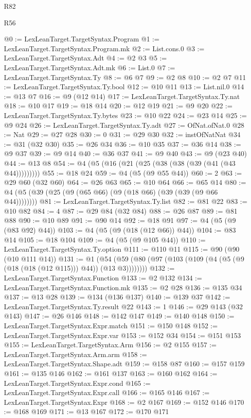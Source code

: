 \begin{lexlean}{R82}
\begin{lexlean}{R56}
\begin{coremodule}
{{{{{{{{{{{{{{{{{{{{{{{{{{{{{{{{{{{{{{{{{{{{{{{{{{{{{{{{{{{{{{{{{{{{{{{{{{{{{{{{{{{{{{{{{{{{{{{{{{{{{{{{{{{{{{{{{{{{{{{{{{{{{{{{{{{{{{{{{{{{{{{{{{{{{{{{{{{{{{{{{{{{{{{{{{{{{{{{{{{{{{{{{{{{{{{{{{{{{{{{{{{{{{{{{{{@0 := LexLeanTarget.TargetSyntax.Program
@1 := LexLeanTarget.TargetSyntax.Program.mk
@2 := List.cons.{0}
@3 := LexLeanTarget.TargetSyntax.Adt
@4 := @2 @3
@5 := LexLeanTarget.TargetSyntax.Adt.mk
@6 := List.{0}
@7 := LexLeanTarget.TargetSyntax.Ty
@8 := @6 @7
@9 := @2 @8
@10 := @2 @7
@11 := LexLeanTarget.TargetSyntax.Ty.bool
@12 := @10 @11
@13 := List.nil.{0}
@14 := @13 @7
@16 := @9 (@12 @14)
@17 := LexLeanTarget.TargetSyntax.Ty.nat
@18 := @10 @17
@19 := @18 @14
@20 := @12 @19
@21 := @9 @20
@22 := LexLeanTarget.TargetSyntax.Ty.bytes
@23 := @10 @22
@24 := @23 @14
@25 := @9 @24
@26 := LexLeanTarget.TargetSyntax.Ty.adt
@27 := OfNat.ofNat.{0}
@28 := Nat
@29 := @27 @28
@30 := 0
@31 := @29 @30
@32 := instOfNatNat
@34 := @31 (@32 @30)
@35 := @26 @34
@36 := @10 @35
@37 := @36 @14
@38 := @9 @37
@39 := @9 @14
@40 := @36 @37
@41 := @9 @40
@43 := @9 (@23 @40)
@44 := @13 @8
@54 := @4 (@5 (@16 (@21 (@25 (@38 (@38 (@39 (@41 (@43 @44)))))))))
@55 := @18 @24
@59 := @4 (@5 (@9 @55 @44))
@60 := 2
@63 := @29 @60 (@32 @60)
@64 := @26 @63
@65 := @10 @64
@66 := @65 @14
@80 := @4 (@5 (@39 (@25 (@9 (@65 @66) (@9 (@18 @66) (@39 (@39 (@9 @66 @44))))))))
@81 := LexLeanTarget.TargetSyntax.Ty.list
@82 := @81 @22
@83 := @10 @82
@84 := 4
@87 := @29 @84 (@32 @84)
@88 := @26 @87
@89 := @81 @88
@90 := @10 @89
@91 := @90 @14
@92 := @18 @91
@97 := @4 (@5 (@9 (@83 @92) @44))
@103 := @4 (@5 (@9 (@18 (@12 @66)) @44))
@104 := @83 @14
@105 := @18 @104
@109 := @4 (@5 (@9 @105 @44))
@110 := LexLeanTarget.TargetSyntax.Ty.option
@111 := @110 @11
@115 := @90 (@90 (@10 @111 @14))
@131 := @1 (@54 (@59 (@80 (@97 (@103 (@109 (@4 (@5 (@9 (@18 (@18 (@12 @115))) @44)) (@13 @3))))))))
@132 := LexLeanTarget.TargetSyntax.Function
@133 := @2 @132
@134 := LexLeanTarget.TargetSyntax.Function.mk
@135 := @2 @28
@136 := @135 @34
@137 := @13 @28
@139 := @134 (@136 @137)
@140 := @139 @37
@142 := LexLeanTarget.TargetSyntax.Ty.result @22
@143 := 1
@146 := @29 @143 (@32 @143)
@147 := @26 @146
@148 := @142 @147
@149 := @140 @148
@150 := LexLeanTarget.TargetSyntax.Expr.match
@151 := @150 @148
@152 := LexLeanTarget.TargetSyntax.Expr.var
@153 := @152 @34
@154 := @151 @153
@155 := LexLeanTarget.TargetSyntax.Arm
@156 := @2 @155
@157 := LexLeanTarget.TargetSyntax.Arm.arm
@158 := LexLeanTarget.TargetSyntax.Shape.adt
@159 := @158 @87
@160 := @157 @159
@161 := @135 @146
@162 := @161 @137
@163 := @160 @162
@164 := LexLeanTarget.TargetSyntax.Expr.cond
@165 := LexLeanTarget.TargetSyntax.Expr.call
@166 := @165 @146
@167 := LexLeanTarget.TargetSyntax.Expr
@168 := @2 @167
@169 := @152 @146
@170 := @168 @169
@171 := @13 @167
@172 := @170 @171
}}}}}}}}}}}}}}}}}}}}}}}}}}}}}}}}}}}}}}}}}}}}}}}}}}}}}}}}}}}}}}}}}}}}}}}}}}}}}}}}}}}}}}}}}}}}}}}}}}}}}}}}}}}}}}}}}}}}}}}}}}}}}}}}}}}}}}}}}}}}}}}}}}}}}}}}}}}}}}}}}}}}}}}}}}}}}}}}}}}}}}}}}}}}}}}}}}}}}}}}}}}}}}}}}}}
\end{coremodule}
\end{lexlean}
\end{lexlean}
